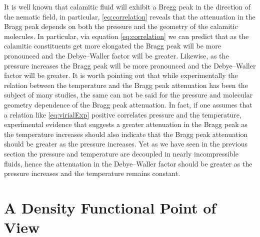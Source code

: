 \documentclass[%
 aip,
 amsmath,amssymb,
 reprint,%
]{revtex4-1}
\begin{document}
It is well known that calamitic fluid will exhibit a Bregg peak in the direction of the nematic field, in particular, \eqref{eq:correlation} reveals that the attenuation in the Bragg peak depends on both the pressure and the geometry of the calamitic molecules.
In particular, via equation \eqref{eq:correlation} we can predict that as the calamitic constituents get more elongated the Bragg peak will be more pronounced and the Debye--Waller factor will be greater.
Likewise, as the pressure increases the Bragg peak will be more pronounced and the Debye--Waller factor will be greater.
It is worth pointing out that while experimentally the relation between the temperature and the Bragg peak attenuation has been the subject of many studies\cite{VetAll79}, the same can not be said for the pressure and molecular geometry dependence of the Bragg peak attenuation.
In fact, if one assumes that a relation like \eqref{eq:virialExp} positive correlates pressure and the temperature, experimental evidence that suggests a greater attenuation in the Bragg peak as the temperature increases\cite{VetAll79} should also indicate that the Bragg peak attenuation should be greater as the pressure increases.
Yet as we have seen in the previous section the pressure and temperature are decoupled in nearly incompressible fluids, hence the attenuation in the Debye--Waller factor should be greater as the pressure increases and the temperature remains constant.
\section{A Density Functional Point of View}

\end{document}

